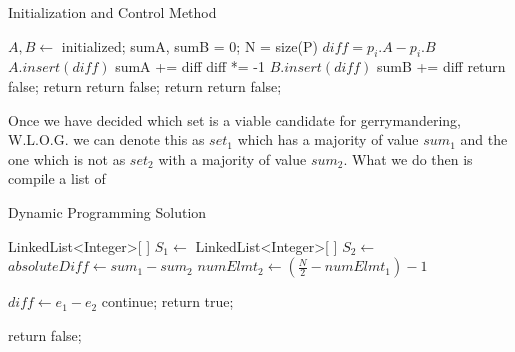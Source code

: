 \documentclass[12pt]{article}
\begin{document}
\begin{algorithm}[H]
\caption{Initialization and Control Method}
\begin{algorithmic}
        \State $A, B \gets$ initialized; sumA, sumB = 0; N = size(P)
            \State $diff = p_i.A - p_i.B$
                \State $A.insert(diff)$
                \State sumA += diff
            \Else
                \State diff *= -1
                \State $B.insert(diff)$
                \State sumB += diff
            \EndIf
        \EndFor
                return false;
            \EndIf
            \State return 
                return false;
            \EndIf
            \State return 
            \State return false;
        \EndIf
    \EndProcedure
\end{algorithmic}
\end{algorithm}

Once we have decided which set is a viable candidate for gerrymandering, W.L.O.G. we can denote this as
$set_1$ which has a majority of value $sum_1$ and the one which is not as $set_2$ with a majority of value
$sum_2$. What we do then is compile a list of

\begin{algorithm}[H]
\caption{Dynamic Programming Solution}
\begin{algorithmic}
        \State LinkedList\textless Integer\textgreater[ ] $S_1 \gets$ 
        \State LinkedList\textless Integer\textgreater[ ] $S_2 \gets$ 
        \State $absoluteDiff \gets sum_1 - sum_2$
            \State $numElmt_2 \gets (\frac{N}{2} - numElmt_1) - 1$

            \Else
                        \State $diff \gets e_1 - e_2$
                            \State continue;
                        \EndIf
                        \State return true;
                    \EndFor

                \EndFor
            \EndIf
        \EndFor
        \State return false;
    \EndProcedure
\end{algorithmic}
\end{algorithm}
\end{document}
